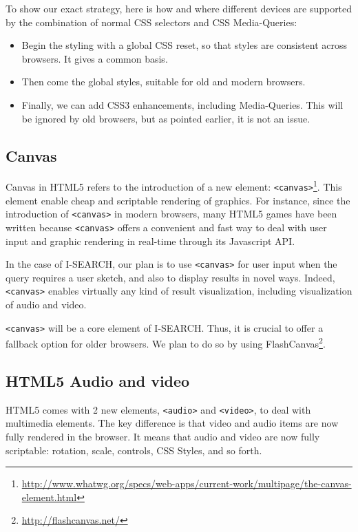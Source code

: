 \documentclass[runningheads,a4paper]{llncs} \usepackage[utf8]{inputenc}
\begin{document}
To show our exact strategy, here is how and where different devices are supported by the combination of normal CSS selectors and CSS Media-Queries: 
\begin{itemize}
\item Begin the styling with a global CSS reset, so that styles are consistent across browsers. It gives a common basis.
\item Then come the global styles, suitable for old and modern browsers.
\item Finally, we can add CSS3 enhancements, including Media-Queries. This will be ignored by old browsers, but as pointed earlier, it is not an issue.
\end{itemize}

\subsection{Canvas}

Canvas in HTML5 refers to the introduction of a new element: {\tt <canvas>}\footnote{\url{http://www.whatwg.org/specs/web-apps/current-work/multipage/the-canvas-element.html}}. This element enable cheap and scriptable rendering of graphics. For instance, since the introduction of {\tt <canvas>} in modern browsers, many HTML5 games have been written because {\tt <canvas>} offers a convenient and fast way to deal with user input and graphic rendering in real-time through its Javascript API. 

In the case of I-SEARCH, our plan is to use {\tt <canvas>} for user input when the query requires a user sketch, and also to display results in novel ways. Indeed, {\tt <canvas>} enables virtually any kind of result visualization, including visualization of audio and video.

{\tt <canvas>} will be a core element of I-SEARCH. Thus, it is crucial to offer a fallback option for older browsers. We plan to do so by using FlashCanvas\footnote{\url{http://flashcanvas.net/}}.


\subsection{HTML5 Audio and video}
HTML5 comes with 2 new elements, {\tt <audio>} and {\tt <video>}, to deal with multimedia elements. The key difference is that video and audio items are now fully rendered in the browser. It means that audio and video are now fully scriptable: rotation, scale, controls, CSS Styles, and so forth. 
\end{document}
